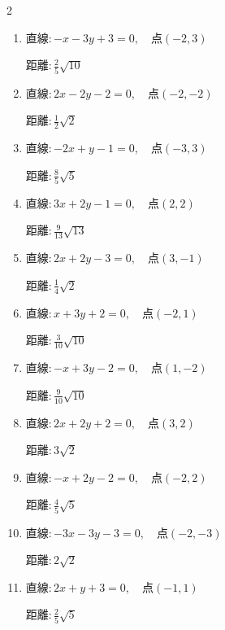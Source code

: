 \begin{multicols}{2}
\begin{enumerate}
        $\displaystyle 距離 : \frac{3}{13}\sqrt{13}$

\columnbreak %

\resetques

  \item $直線:-x-3y+3=0,\quad 点 ( -2, 3 )$

        $\displaystyle 距離 : \frac{2}{5}\sqrt{10}$

  \item $直線:2x-2y-2=0,\quad 点 ( -2, -2 )$

        $\displaystyle 距離 : \frac{1}{2}\sqrt{2}$

  \item $直線:-2x+y-1=0,\quad 点 ( -3, 3 )$

        $\displaystyle 距離 : \frac{8}{5}\sqrt{5}$

  \item $直線:3x+2y-1=0,\quad 点 ( 2, 2 )$

        $\displaystyle 距離 : \frac{9}{13}\sqrt{13}$

  \item $直線:2x+2y-3=0,\quad 点 ( 3, -1 )$

        $\displaystyle 距離 : \frac{1}{4}\sqrt{2}$

  \item $直線:x+3y+2=0,\quad 点 ( -2, 1 )$

        $\displaystyle 距離 : \frac{3}{10}\sqrt{10}$

  \item $直線:-x+3y-2=0,\quad 点 ( 1, -2 )$

        $\displaystyle 距離 : \frac{9}{10}\sqrt{10}$

  \item $直線:2x+2y+2=0,\quad 点 ( 3, 2 )$

        $\displaystyle 距離 : 3\sqrt{2}$

  \item $直線:-x+2y-2=0,\quad 点 ( -2, 2 )$

        $\displaystyle 距離 : \frac{4}{5}\sqrt{5}$

  \item $直線:-3x-3y-3=0,\quad 点 ( -2, -3 )$

        $\displaystyle 距離 : 2\sqrt{2}$

\columnbreak %

  \item $直線:2x+y+3=0,\quad 点 ( -1, 1 )$

        $\displaystyle 距離 : \frac{2}{5}\sqrt{5}$


\end{enumerate}
\end{multicols}
